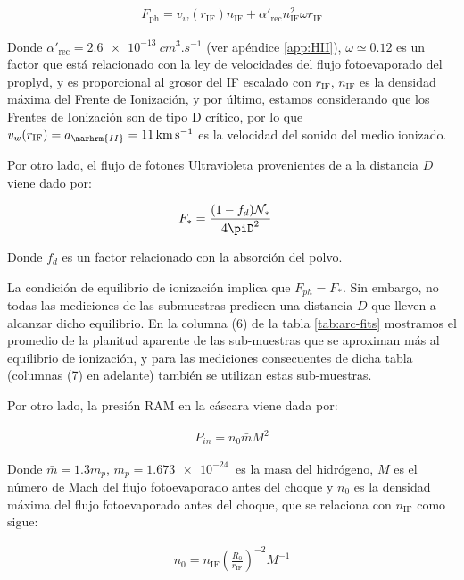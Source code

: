 \begin{align}
  F_{\mathrm{ph}} = v_w(r_{\mathrm{IF}}) n_{\mathrm{IF}} + \alpha'_{\mathrm{rec}}n^2_{\mathrm{IF}} \omega r_{\mathrm{IF}}\label{eq:F-ph}
\end{align}

Donde $\alpha'_{\mathrm{rec}} = \SI{2.6e-13}{cm^3.s^{-1}}$ (ver apéndice \ref{app:HII}), $\omega \simeq 0.12$ es un factor que está relacionado con la ley de velocidades del flujo fotoevaporado del proplyd, y es proporcional al grosor del IF escalado con $r_{\mathrm{IF}}$, $n_{\mathrm{IF}}$ es la densidad máxima del Frente de Ionización, y por último, estamos considerando que los Frentes de Ionización son de tipo D crítico, por lo que $v_w(r_{\mathrm{IF}}) = a_\marhrm{II} = \SI{11}{km.s^{-1}}$ es la velocidad del sonido del medio ionizado.

Por otro lado, el flujo de fotones Ultravioleta provenientes de \thC{} a la distancia $D$ viene dado por:

\begin{align}
   F_* &= \frac{(1-f_d)\Nio_*}{4\piD^2} \label{eq:F-star} 
\end{align}

Donde $f_d$ es un factor relacionado con la absorción del polvo.

La condición de equilibrio de ionización implica que $F_{ph} = F_*$. Sin embargo, no todas las mediciones de las submuestras predicen una distancia $D$ que lleven a alcanzar dicho equilibrio. En la columna (6) de la tabla \ref{tab:arc-fits} mostramos el promedio de la planitud aparente de las sub-muestras que se aproximan más al equilibrio de ionización, y para las mediciones consecuentes de dicha tabla (columnas (7) en adelante) también se utilizan estas sub-muestras.

Por otro lado, la presión RAM en la cáscara viene dada por:

\begin{align}
  P_{in} = n_0\bar{m}M^2 \label{eq:P-in}
\end{align}

Donde $\bar{m} = 1.3 m_p$, $m_p = \SI{1.673e-24}{}$ es la masa del hidrógeno, $M$ es el número de Mach del flujo fotoevaporado antes del choque y $n_0$ es la densidad máxima del flujo fotoevaporado antes del choque, que se relaciona con $n_{\mathrm{IF}}$ como sigue:

\begin{align}
  n_0 = n_{\mathrm{IF}}\left(\frac{R_0}{r_{\mathrm{IF}}}\right)^{-2} M^{-1} \label{eq:density-scale}
\end{align}


